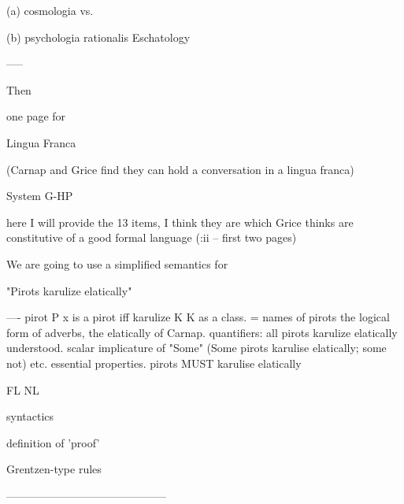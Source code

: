 \documentclass[10pt,titlepage]{book}
\begin{document}
{                                                                            
   (a) cosmologia
                                             vs.
 
                                                                            
   (b) psychologia rationalis
                                     Eschatology
 
                    
         
 
-----
 
Then
 
                             one page for
 
 
 
                               Lingua Franca
 
               (Carnap and Grice find they can hold
               a conversation in a lingua franca)
 
                         System G-HP
 
                    here I will provide 
                   the 13 items, I think they are
                 which Grice thinks are constitutive
                    of a good formal language
                    (\cite{grice89}:ii -- first two pages)
 
 
 
 We are going to use a simplified semantics for
 
         "Pirots karulize  elatically"
 
---- pirot P  x is a pirot iff
    karulize K   K as  a class. = 
    names of pirots
    the logical form of adverbs, the elatically of  Carnap.
    quantifiers: all pirots karulize elatically  understood.
          scalar implicature  of "Some" (Some pirots karulise elatically; 
some not)
    etc.
    essential properties.
        pirots MUST karulise  elatically
 
 
 
          FL                                          NL
 
 
                  syntactics
 
                 
 
                definition of 'proof'
 
                
              
                 Grentzen-type rules
 
 
           --------------------------------------------
 
}
\end{document}
